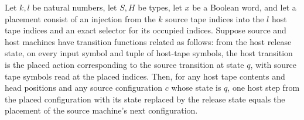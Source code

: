 \begin{lemma}
\label{Complexity.clPlaced_release}
\leanok
{}
Let $k,l$ be natural numbers, let $S,H$ be types, let $x$ be a Boolean word, and let a
placement consist of an injection from the $k$ source tape indices into the $l$ host
tape indices and an exact selector for its occupied indices. Suppose source and host
machines have transition functions related as follows: from the host release state, on
every input symbol and tuple of host-tape symbols, the host transition is the placed
action corresponding to the source transition at state $q$, with source tape symbols
read at the placed indices. Then, for any host tape contents and head positions and any
source configuration $c$ whose state is $q$, one host step from the placed configuration
with its state replaced by the release state equals the placement of the source
machine's next configuration.
\end{lemma}
